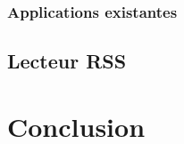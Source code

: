 \documentclass[twoside,UTF8]{EPURapport}
\begin{document}
		\subsection{Applications existantes}

	\section{Lecteur RSS}
	


\chapter{Conclusion}

\annexes
\end{document}
